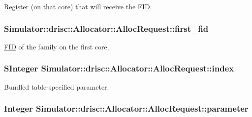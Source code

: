 \hyperlink{class_simulator_1_1_register}{Register} (on that core) that will receive the \hyperlink{struct_simulator_1_1_f_i_d}{F\+I\+D}. 

\hypertarget{struct_simulator_1_1drisc_1_1_allocator_1_1_alloc_request_a1957c8a6218a2bb4c7ac3aaf191d92d3}{
\subsubsection[{first\+\_\+fid}]{ Simulator\+::drisc\+::\+Allocator\+::\+Alloc\+Request\+::first\+\_\+fid}}\label{struct_simulator_1_1drisc_1_1_allocator_1_1_alloc_request_a1957c8a6218a2bb4c7ac3aaf191d92d3}


\hyperlink{struct_simulator_1_1_f_i_d}{F\+I\+D} of the family on the first core. 

\hypertarget{struct_simulator_1_1drisc_1_1_allocator_1_1_alloc_request_a30e54ac67d3c145e6b57ac92ac7f306b}{
\subsubsection[{index}]{\setlength{\rightskip}{0pt plus 5cm}S\+Integer Simulator\+::drisc\+::\+Allocator\+::\+Alloc\+Request\+::index}}\label{struct_simulator_1_1drisc_1_1_allocator_1_1_alloc_request_a30e54ac67d3c145e6b57ac92ac7f306b}


Bundled table-\/specified parameter. 

\hypertarget{struct_simulator_1_1drisc_1_1_allocator_1_1_alloc_request_ad6fa8a5ab6dc2c363ec2d6de2c1d2566}{
\subsubsection[{parameter}]{\setlength{\rightskip}{0pt plus 5cm}Integer Simulator\+::drisc\+::\+Allocator\+::\+Alloc\+Request\+::parameter}}\label{struct_simulator_1_1drisc_1_1_allocator_1_1_alloc_request_ad6fa8a5ab6dc2c363ec2d6de2c1d2566}


